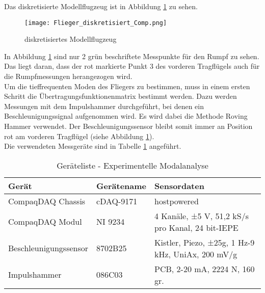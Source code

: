     \noindent
    Das diskretisierte Modellflugzeug ist in Abbildung
    \ref{fig: Flieger_diskretisiert} zu sehen.

    \begin{figure}[H]
        \centering
        \texttt{[image: Flieger\_diskretisiert\_Comp.png]}
        \caption{diskretisiertes Modellflugzeug}
        \label{fig: Flieger_diskretisiert}
    \end{figure}

    \noindent
    In Abbildung \ref{fig: Flieger_diskretisiert} sind nur 2 grün beschriftete
    Messpunkte für den Rumpf zu sehen. Das liegt daran, dass der rot markierte
    Punkt 3 des vorderen Tragflügels auch für die Rumpfmessungen herangezogen
    wird.
    \\

    \noindent
    Um die tieffrequenten Moden des Fliegers zu bestimmen, muss in einem ersten
    Schritt die Übertragungsfunktionenmatrix bestimmt werden. Dazu werden
    Messungen mit dem Impulshammer durchgeführt, bei denen ein
    Beschleunigungssignal aufgenommen wird. Es wird dabei die Methode Roving
    Hammer verwendet. Der Beschleunigungssensor bleibt somit immer an Position
     rot\grqq \hspace{0.05cm} am vorderen Tragflügel (siehe Abbildung
    \ref{fig: Flieger_diskretisiert}).
    \\

    \noindent
    Die verwendeten Messgeräte sind in Tabelle \ref{tab: Geräteliste_EMA}
    angeführt.

    \begin{table}[H]
        \centering
        \begin{tabular}{|l|l|p{6cm}|}
            \hline
            \textbf{Gerät}  &   \textbf{Gerätename}   &   \textbf{Sensordaten} \\
            \hline \hline
            CompaqDAQ Chassis & cDAQ-9171 & hostpowered \\
            \hline
            CompaqDAQ Modul & NI 9234 & 4 Kanäle, ±5 V, 51,2 kS/s pro Kanal, 24 bit-IEPE  \\
            \hline
            Beschleunigungssensor & 8702B25 & Kistler, Piezo, ±25g, 1 Hz-9 kHz, UniAx, 200 mV/g  \\
            \hline
            Impulshammer & 086C03 & PCB, 2-20 mA, 2224 N, 160 gr.  \\
            \hline
        \end{tabular}
        \caption{Geräteliste - Experimentelle Modalanalyse}
        \label{tab: Geräteliste_EMA}
    \end{table}    

